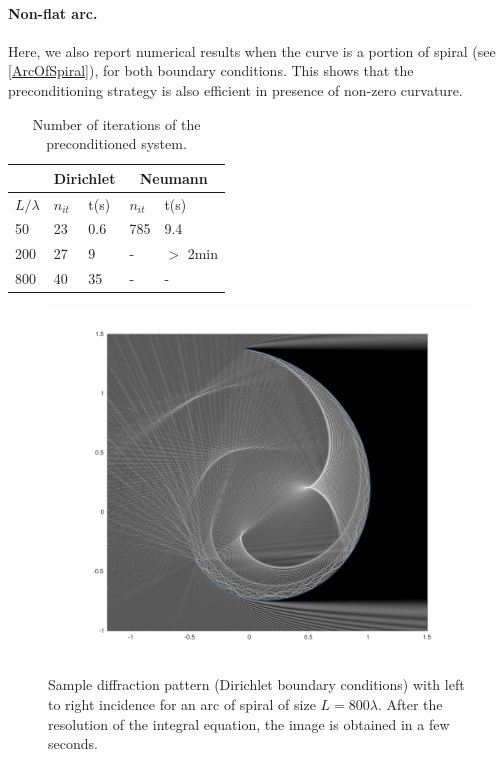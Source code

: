 \documentclass[a4paper]{article}
\begin{document}
\paragraph{Non-flat arc.} Here, we also report numerical results when the curve is a portion of spiral (see \autoref{ArcOfSpiral}), for both boundary conditions. This shows that the preconditioning strategy is also efficient in presence of non-zero curvature. 
\begin{table}[H]
	\begin{center}
		\begin{tabular}{|| m{4em} | m{4em} | m{4em} | m{4em} | m{4em}||} 
			\hline
			\multicolumn{1}{||c|}{ }&
			\multicolumn{2}{c|}{Dirichlet}&\multicolumn{2}{c||}{Neumann}\\
			\hline
			$L/\lambda$ & $n_{it}$& t(s) & $n_{it}$ & t(s)\\
			\hline\hline
			50 & 23 & 0.6 & 785 & 9.4\\
			\hline
			200 & 27 & 9 & - &  $>$ 2min\\
			\hline
			800 & 40 & 35 & - & -\\
			\hline
		\end{tabular}
	\end{center}
	\caption{Number of iterations of the preconditioned system. }
	\label{TableNitTimeHlemholtzDirSpiral}
\end{table}
\vspace{-1cm}
\begin{figure}[H]
	\centering
	\includegraphics[width=\linewidth]{../figs/arcOfSpiral800_3}
	\vspace{-1.2cm}
	\caption{Sample diffraction pattern (Dirichlet boundary conditions) with left to right incidence for an arc of spiral of size $L = 800 \lambda$. After the resolution of the integral equation, the image is obtained in a few seconds.}
	\label{ArcOfSpiral}
\end{figure}
\end{document}
